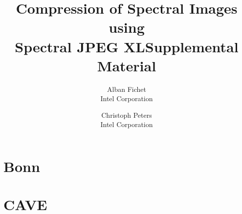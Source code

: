 \documentclass{article}
\author{Alban Fichet\\Intel Corporation \and Christoph Peters\\Intel Corporation}
\title{Compression of Spectral Images using\\Spectral JPEG XL\newline \newline \small{Supplemental Material}}
\date{}
\begin{document}
\maketitle

\tableofcontents
\clearpage



\section{Bonn}



\section{CAVE}


\end{document}
